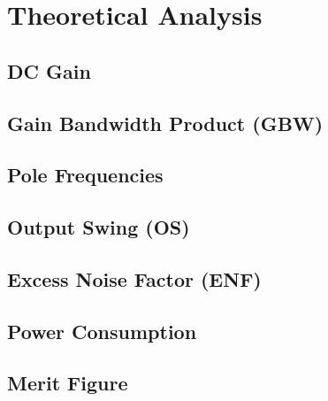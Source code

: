 \section{Theoretical Analysis}

\subsection{DC Gain}

\subsection{Gain Bandwidth Product (GBW)}

\subsection{Pole Frequencies}

\subsection{Output Swing (OS)}

\subsection{Excess Noise Factor (ENF)}

\subsection{Power Consumption}

\subsection{Merit Figure}

